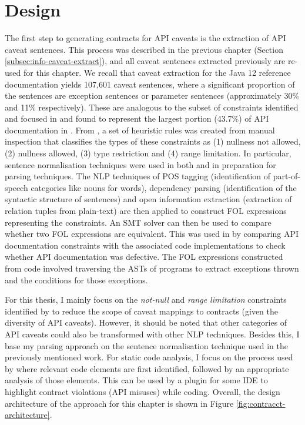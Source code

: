 \section{Design}
\label{sec:contract-design}
The first step to generating contracts for API caveats is the extraction of API caveat sentences. This process was described in the previous chapter (Section \ref{subsec:info-caveat-extract}), and all caveat sentences extracted previously are re-used for this chapter. We recall that caveat extraction for the Java 12 reference documentation yields 
107,601 caveat sentences, where a significant proportion of the sentences are exception sentences or parameter sentences (approximately 30\% and 11\% respectively). These are analogous to the subset of constraints identified and focused in \cite{zhou-directive} and found to represent the largest portion (43.7\%) of API documentation in \cite{directives-study}. From \cite{zhou-directive}, a set of heuristic rules was created from manual inspection that classifies the types of these constraints as (1) nullness not allowed, (2) nullness allowed, (3) type restriction and (4) range limitation. In particular, sentence normalisation techniques were used in both \cite{zhou-directive} and \cite{blasi2018translating} in preparation for parsing techniques. The NLP techniques of POS tagging (identification of part-of-speech categories like nouns for words), dependency parsing (identification of the syntactic structure of sentences) and open information extraction (extraction of relation tuples from plain-text)
are then applied to construct FOL expressions representing the constraints. An SMT solver can then be used to compare whether two FOL expressions are equivalent. This was used in \cite{zhou-directive} by comparing API documentation constraints with the associated code implementations to check whether API documentation was defective. The FOL expressions constructed from code involved traversing the ASTs of programs to extract exceptions thrown and the conditions for those exceptions.\bigbreak

For this thesis, I mainly focus on the \textit{not-null} and \textit{range limitation} constraints identified by \cite{zhou-directive} to reduce the scope of caveat mappings to contracts (given the diversity of API caveats). However, it should be noted that other categories of API caveats could also be transformed with other NLP techniques. Besides this, I base my parsing approach on the sentence normalisation technique used in the previously mentioned work. For static code analysis, I focus on the process used by \cite{zhou-directive} where relevant code elements are first identified, followed by an appropriate analysis of those elements. This can be used by a plugin for some IDE to highlight contract violations (API misuses) while coding. Overall, the design architecture of the approach for this chapter is shown in Figure \ref{fig:contracct-architecture}.

